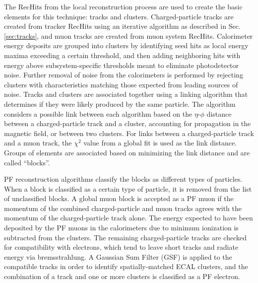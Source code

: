 The RecHits from the local reconstruction process are used to create the basic elements for this technique: tracks and clusters. Charged-particle tracks are created from tracker RecHits using an iterative algorithm as described in Sec. \ref{sec:tracks}, and muon tracks are created from muon system RecHits. Calorimeter energy deposits are grouped into clusters by identifying seed hits as local energy maxima exceeding a certain threshold, and then adding neighboring hits with energy above subsystem-specific thresholds meant to eliminate photodetector noise. Further removal of noise from the calorimeters is performed by rejecting clusters with characteristics matching those expected from leading sources of noise. Tracks and clusters are associated together using a linking algorithm that determines if they were likely produced by the same particle. The algorithm considers a possible link between each algorithm based on the $\eta$-$\phi$ distance between a charged-particle track and a cluster, accounting for propagation in the magnetic field, or between two clusters. For links between a charged-particle track and a muon track, the $\chi^{2}$ value from a global fit is used as the link distance. Groups of elements are associated based on minimizing the link distance and are called ``blocks''.

PF reconstruction algorithms classify the blocks as different types of particles. When a block is classified as a certain type of particle, it is removed from the list of unclassified blocks. A global muon block is accepted as a PF muon if the momentum of the combined charged-particle and muon tracks agrees with the momentum of the charged-particle track alone. The energy expected to have been deposited by the PF muons in the calorimeters due to minimum ionization is subtracted from the clusters. The remaining charged-particle tracks are checked for compatibility with electrons, which tend to leave short tracks and radiate energy via bremsstrahlung. A Gaussian Sum Filter (GSF) is applied to the compatible tracks in order to identify spatially-matched ECAL clusters, and the combination of a track and one or more clusters is classified as a PF electron.

